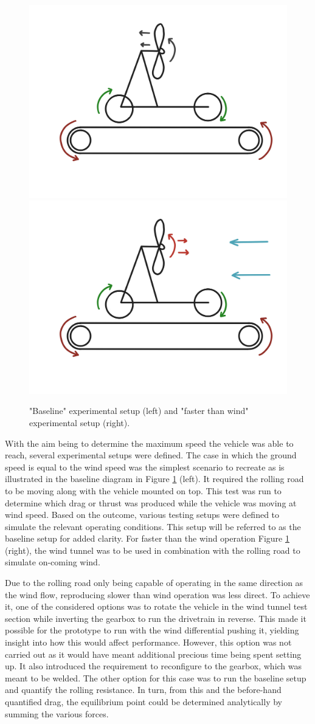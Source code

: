 \begin{figure}[!htbp]
    \centering
    \includegraphics[width=0.4\linewidth]{images/part10/expebaseline.jpg}
    \includegraphics[width=0.4\linewidth]{images/part10/fasterthanwind.jpg}
    \caption{"Baseline" experimental setup (left) and "faster than wind" experimental setup (right).}
    \label{fig:baseline}
\end{figure}

With the aim being to determine the maximum speed the vehicle was able to reach, several experimental setups were defined. The case in which the ground speed is equal to the wind speed was the simplest scenario to recreate as is illustrated in the baseline diagram in Figure \ref{fig:baseline} (left). It required the rolling road to be moving along with the vehicle mounted on top. This test was run to determine which drag or thrust was produced while the vehicle was moving at wind speed. Based on the outcome, various testing setups were defined to simulate the relevant operating conditions. This setup will be referred to as the baseline setup for added clarity. For faster than the wind operation Figure \ref{fig:baseline} (right), the wind tunnel was to be used in combination with the rolling road to simulate on-coming wind.

Due to the rolling road only being capable of operating in the same direction as the wind flow, reproducing slower than wind operation was less direct. To achieve it, one of the considered options was to rotate the vehicle in the wind tunnel test section while inverting the gearbox to run the drivetrain in reverse. This made it possible for the prototype to run with the wind differential pushing it, yielding insight into how this would affect performance. However, this option was not carried out as it would have meant additional precious time being spent setting up. It also introduced the requirement to reconfigure to the gearbox, which was meant to be welded. The other option for this case was to run the baseline setup and quantify the rolling resistance. In turn, from this and the before-hand quantified drag, the equilibrium point could be determined analytically by summing the various forces.

